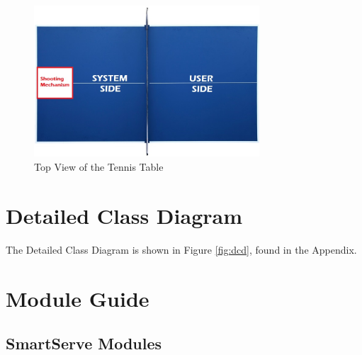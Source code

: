\documentclass[11pt]{article}
\begin{document}
\begin{figure}[H]
   \centering
   \includegraphics[width=0.75\textwidth]{../img/Table-Tennis-Top-View.png} %
   \caption{Top View of the Tennis Table}
   \label{fig:table-tennis-top-view}
\end{figure}

\section{Detailed Class Diagram}
The Detailed Class Diagram is shown in Figure \ref{fig:dcd}, found in the Appendix.

\section{Module Guide}
\subsection{SmartServe Modules} %
\end{document}
